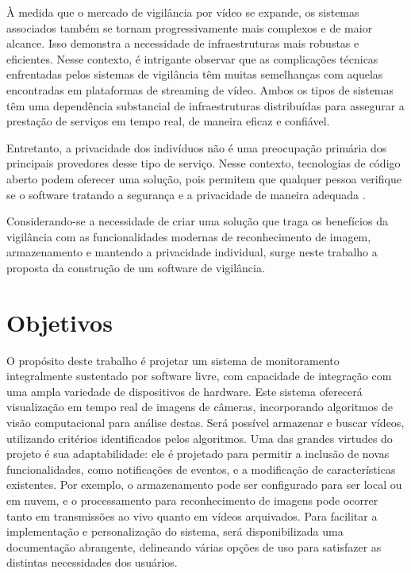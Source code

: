 \documentclass[12pt, %
openright, 
oneside, %
a4paper,    %
brazil]{facom-ufu-abntex2}
\begin{document}
À medida que o mercado de vigilância por vídeo se expande,
os sistemas associados também se tornam progressivamente mais complexos e de maior alcance.
Isso demonstra a necessidade de infraestruturas mais robustas e eficientes.
Nesse contexto, é intrigante observar que as complicações técnicas enfrentadas pelos
sistemas de vigilância têm muitas semelhanças com aquelas encontradas em plataformas de
streaming de vídeo. Ambos os tipos de
sistemas têm uma dependência substancial de infraestruturas distribuídas para
assegurar a prestação de serviços em tempo real, de maneira eficaz e confiável.

Entretanto, a privacidade dos indivíduos não é uma preocupação primária dos
principais provedores desse tipo de serviço. Nesse contexto, tecnologias de
código aberto podem oferecer uma solução, pois permitem que qualquer pessoa
verifique se o software tratando a segurança e a privacidade de maneira
adequada \cite{mardjan2016open}.

Considerando-se a necessidade de criar uma solução que traga os benefícios da
vigilância com as funcionalidades modernas de reconhecimento de imagem,
armazenamento e mantendo a privacidade individual, surge neste trabalho a
proposta da construção de um software de vigilância.

\section{Objetivos}

O propósito deste trabalho é projetar um sistema de monitoramento integralmente
sustentado por software livre, com capacidade de integração com uma ampla
variedade de dispositivos de hardware. Este sistema oferecerá visualização em
tempo real de imagens de câmeras, incorporando algoritmos de visão
computacional para análise destas. Será possível armazenar e buscar vídeos,
utilizando critérios identificados pelos algoritmos. Uma das grandes virtudes
do projeto é sua adaptabilidade: ele é projetado para permitir a inclusão de
novas funcionalidades, como notificações de eventos, e a modificação de
características existentes. Por exemplo, o armazenamento pode ser configurado
para ser local ou em nuvem, e o processamento para reconhecimento de imagens
pode ocorrer tanto em transmissões ao vivo quanto em vídeos arquivados. Para
facilitar a implementação e personalização do sistema, será disponibilizada uma
documentação abrangente, delineando várias opções de uso para satisfazer as
distintas necessidades dos usuários.
\end{document}

